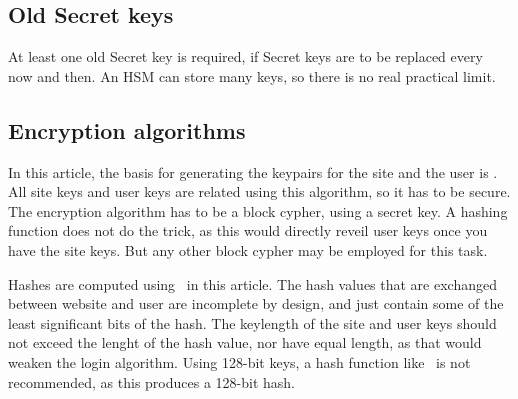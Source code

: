 \subsection{Old Secret keys}
At least one old Secret key is required,
if Secret keys are to be replaced every now and then.
An HSM can store many keys,
so there is no real practical limit.
\subsection{Encryption algorithms}
In this article,
the basis for generating the keypairs for the site and the user is \AES.
All site keys and user keys are related using this algorithm,
so it has to be secure.
The encryption algorithm has to be a block cypher,
using a secret key.
A hashing function does not do the trick,
as this would directly reveil user keys once you have the site keys.
But any other block cypher may be employed for this task.
\par
Hashes are computed using \SHA\ in this article.
The hash values that are exchanged between website and user are incomplete by design,
and just contain some of the least significant bits of the hash.
The keylength of the site and user keys
should not exceed the lenght of the hash value,
nor have equal length,
as that would weaken the login algorithm.
Using 128-bit keys, a hash function like \MDV\ is not recommended, as this produces a 128-bit hash.
\par
\clearpage
